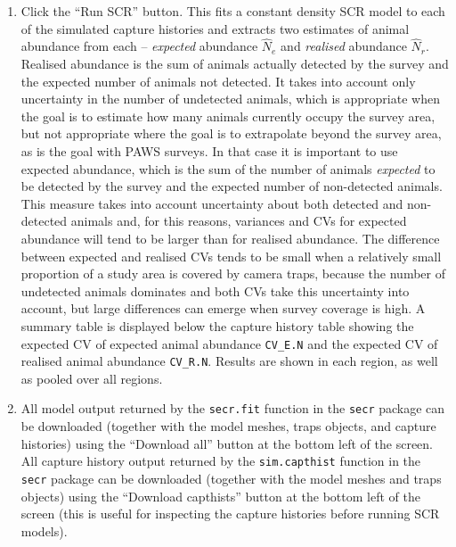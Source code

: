 \documentclass[a4paper,11pt, draft]{article} %
\begin{document}
\begin{enumerate}
\item Click the ``Run SCR'' button. This fits a constant density SCR model to each of the simulated capture histories and extracts two estimates of animal abundance from each -- {\it expected} abundance $\hat{N}_e$ and {\it realised} abundance $\hat{N}_r$. Realised abundance is the sum of animals actually detected by the survey and the expected number of animals not detected. It takes into account only uncertainty in the number of undetected animals, which is appropriate when the goal is to estimate how many animals currently occupy the survey area, but not appropriate where the goal is to extrapolate beyond the survey area, as is the goal with PAWS surveys. In that case it is important to use expected abundance, which is the sum of the number of animals {\it expected} to be detected by the survey and the expected number of non-detected animals. This measure takes into account uncertainty about both detected and non-detected animals and, for this reasons, variances and CVs for expected abundance will tend to be larger than for realised abundance. The difference between expected and realised CVs tends to be small when a relatively small proportion of a study area is covered by camera traps, because the number of undetected animals dominates and both CVs take this uncertainty into account, but large differences can emerge when survey coverage is high. A summary table is displayed below the capture history table showing the expected CV of expected animal abundance \verb!CV_E.N! and the expected CV of realised animal abundance \verb!CV_R.N!. Results are shown in each region, as well as pooled over all regions. 
\item All model output returned by the \texttt{secr.fit} function in the \texttt{secr} package can be downloaded (together with the model meshes, traps objects, and capture histories) using the ``Download all'' button at the bottom left of the screen. All capture history output returned by the \texttt{sim.capthist} function in the \texttt{secr} package can be downloaded (together with the model meshes and traps objects) using the ``Download capthists'' button at the bottom left of the screen (this is useful for inspecting the capture histories before running SCR models).
\end{enumerate}
\end{document}
